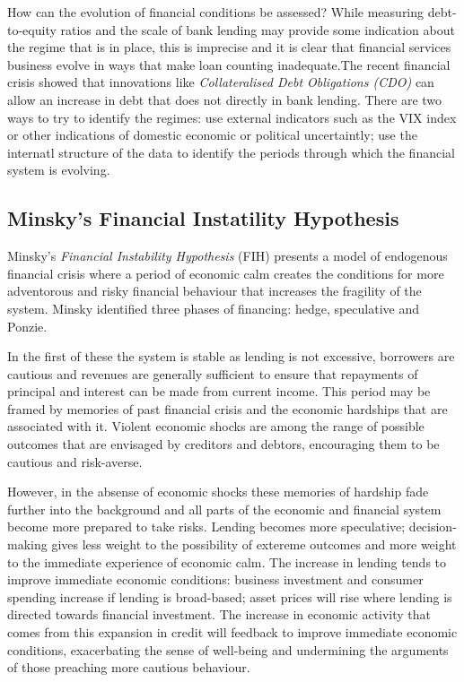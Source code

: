 \documentclass[12pt, a4paper, oneside]{article} %
\begin{document}
How can the evolution of financial conditions be assessed?  While measuring debt-to-equity ratios and the scale of bank lending may provide some indication about the regime that is in place, this is imprecise and it is clear that financial services business evolve in ways that make loan counting  inadequate.The recent financial crisis showed that innovations like \emph{Collateralised Debt Obligations (CDO)} can allow an increase in debt that does not directly in bank lending. There are two ways to try to identify the regimes: use external indicators such as the VIX index or other indications of domestic economic or political uncertaintly; use the internatl structure of the data to identify the periods through which the financial system  is evolving.  

\subsection{Minsky's Financial Instatility Hypothesis}
Minsky's \emph{Financial Instability Hypothesis} (FIH) presents a model of endogenous financial crisis where a period of economic calm creates the conditions for more adventorous and risky financial behaviour that increases the fragility of the system.  Minsky identified three phases of financing:  hedge, speculative and Ponzie.  

In the first of these the system is stable as lending is not excessive, borrowers are cautious and revenues are generally sufficient to ensure that repayments of principal and interest can be made from current income.  This period may be framed by memories of past financial crisis and the economic hardships that are associated with it.  Violent economic shocks are among the range of possible outcomes that are envisaged by creditors and debtors, encouraging them to be cautious and risk-averse. 

However, in the absense of economic shocks these memories of hardship fade further into the background and all parts of the economic and financial system become more prepared to take risks.  Lending becomes more speculative; decision-making gives less weight to the possibility of extereme outcomes and more weight to the immediate experience of economic calm.  The increase in lending tends to improve immediate economic conditions:  business investment and consumer spending increase if lending is broad-based; asset prices will rise where lending is directed towards financial investment.  The increase in economic activity that comes from this expansion in credit will feedback to improve immediate economic conditions, exacerbating the sense of well-being and undermining the arguments of those preaching more cautious behaviour.  
\end{document}
